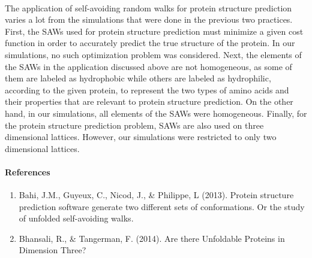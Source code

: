 \documentclass[12pt]{article}
\begin{document}
\paragraph{} The application of self-avoiding random walks for protein structure prediction varies a lot from the simulations that were done in the previous two practices. First, the SAWs used for protein structure prediction must minimize a given cost function in order to accurately predict the true structure of the protein. In our simulations, no such optimization problem was considered. Next, the elements of the SAWs in the application discussed above are not homogeneous, as some of them are labeled as hydrophobic while others are labeled as hydrophilic, according to the given protein, to represent the two types of amino acids and their properties that are relevant to protein structure prediction. On the other hand, in our simulations, all elements of the SAWs were homogeneous. Finally, for the protein structure prediction problem, SAWs are also used on three dimensional lattices. However, our simulations were restricted to only two dimensional lattices.

\pagebreak

\paragraph{References}

\begin{enumerate}

\item Bahi, J.M., Guyeux, C., Nicod, J., \& Philippe, L (2013). Protein structure prediction software generate two different sets of conformations. Or the study of unfolded self-avoiding walks.

\item Bhansali, R., \& Tangerman, F. (2014). Are there Unfoldable Proteins in Dimension Three?

\end{enumerate}
\end{document}
